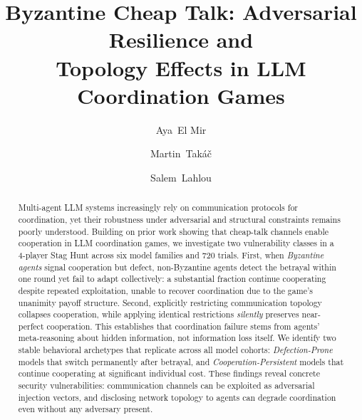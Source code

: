 \documentclass[runningheads]{llncs}
\begin{document}
\title{Byzantine Cheap Talk: Adversarial Resilience and\\Topology Effects in LLM Coordination Games}

\author{Aya~El Mir \and Martin~Takáč \and Salem~Lahlou}

\maketitle

\begin{abstract}
Multi-agent LLM systems increasingly rely on communication protocols for coordination, yet their robustness under adversarial and structural constraints remains poorly understood. Building on prior work showing that cheap-talk
channels enable cooperation in LLM coordination games, we investigate two vulnerability classes in a 4-player Stag Hunt across six model families and 720 trials. First, when \emph{Byzantine agents} signal cooperation but defect, non-Byzantine agents detect the betrayal within one round yet fail to adapt collectively: a substantial fraction continue cooperating despite repeated exploitation, unable to recover coordination due to the game's unanimity payoff structure.
Second, explicitly restricting communication topology collapses cooperation, while applying identical restrictions \emph{silently} preserves near-perfect cooperation. This establishes that coordination failure stems from agents' meta-reasoning about hidden information, not information loss itself. We identify two stable behavioral archetypes that replicate across all model cohorts: \emph{Defection-Prone} models that switch permanently after betrayal, and \emph{Cooperation-Persistent} models that continue cooperating at significant individual cost. These findings reveal concrete security vulnerabilities: communication channels can be exploited as adversarial injection vectors, and disclosing network topology to agents can degrade coordination even without any adversary present.

\end{abstract}
\end{document}
